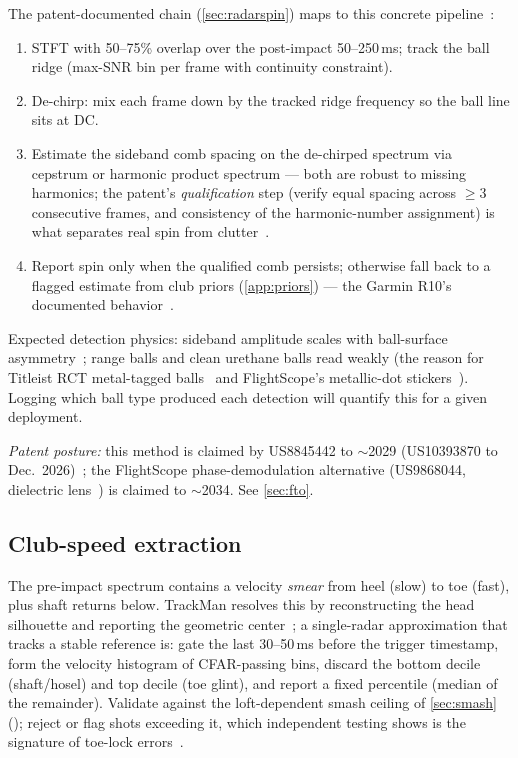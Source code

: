 The patent-documented chain (\cref{sec:radarspin}) maps to this concrete
pipeline~\cite{us8845442,trackmanspinpatentblog}:
\begin{enumerate}\itemsep2pt
\item STFT with 50--75\% overlap over the post-impact 50--250\,ms;
      track the ball ridge (max-SNR bin per frame with continuity
      constraint).
\item De-chirp: mix each frame down by the tracked ridge frequency so
      the ball line sits at DC.
\item Estimate the sideband comb spacing on the de-chirped spectrum via
      cepstrum or harmonic product spectrum --- both are robust to
      missing harmonics; the patent's \emph{qualification} step
      (verify equal spacing across $\ge$3 consecutive frames, and
      consistency of the harmonic-number assignment) is what separates
      real spin from clutter~\cite{us8845442}.
\item Report spin only when the qualified comb persists; otherwise fall
      back to a flagged estimate from club priors
      (\cref{app:priors}) --- the Garmin R10's documented
      behavior~\cite{garminr10accuracy}.
\end{enumerate}
Expected detection physics: sideband amplitude scales with
ball-surface asymmetry~\cite{us8845442}; range balls and clean urethane
balls read weakly (the reason for Titleist RCT metal-tagged
balls~\cite{mygolfspymlm2pro} and FlightScope's metallic-dot
stickers~\cite{mevoteardown}). Logging which ball type produced each
detection will quantify this for a given deployment.

\emph{Patent posture:} this method is claimed by
US8845442 to $\sim$2029 (US10393870 to Dec.\ 2026)~\cite{us8845442};
the FlightScope phase-demodulation alternative (US9868044, dielectric
lens~\cite{us9868044}) is claimed to $\sim$2034. See \cref{sec:fto}.

\subsection{Club-speed extraction}

The pre-impact spectrum contains a velocity \emph{smear} from heel
(slow) to toe (fast), plus shaft returns below. TrackMan resolves this
by reconstructing the head silhouette and reporting the geometric
center~\cite{trackmanclubspeed}; a single-radar approximation that
tracks a stable reference is: gate the last 30--50\,ms before the
trigger timestamp, form the velocity histogram of CFAR-passing bins,
discard the bottom decile (shaft/hosel) and top decile (toe glint), and
report a fixed percentile (median of the remainder). Validate against
the loft-dependent smash ceiling of \cref{sec:smash}
(\cite{tutelmansmash}); reject or flag shots exceeding it, which
independent testing shows is the signature of toe-lock
errors~\cite{leach2017}.

